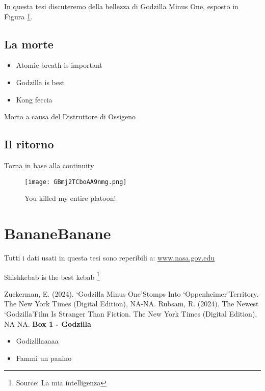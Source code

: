 \documentclass[12pt]{article}
\begin{document}
In questa tesi discuteremo della bellezza di Godzilla Minus One, esposto in Figura  \ref{fig:minus_one}.

\subsection{La morte}
\begin{itemize}
    \item Atomic breath is important
    \item Godzilla is best
    \item Kong feccia
\end{itemize}
Morto a causa del Distruttore di Ossigeno
\subsection{Il ritorno}
Torna in base alla continuity


\newpage
\begin{figure}
    \centering
    \texttt{[image: GBmj2TCboAA9nmg.png]}
    \caption{You killed my entire platoon!}
    \label{fig:minus_one}
\end{figure}

\section{BananeBanane}

Tutti i dati usati in questa tesi sono reperibili a: 
\url{www.nasa.gov.edu}

Shishkebab is the best kebab
\footnote{Source: La mia intelligenza}

\begin{thebibliography}{999}
    Zuckerman, E. (2024). ‘Godzilla Minus One’Stomps Into ‘Oppenheimer’Territory. The New York Times (Digital Edition), NA-NA.
    Rubsam, R. (2024). The Newest ‘Godzilla’Film Is Stranger Than Fiction. The New York Times (Digital Edition), NA-NA.
\hline
\bigskip
\textbf{Box 1 - Godzilla}
\bigskip
\begin{itemize}
    \item Godizlllaaaaa
    \item Fammi un panino
\end{itemize}
\bigskip
\hline
\end{thebibliography}
\end{document}
